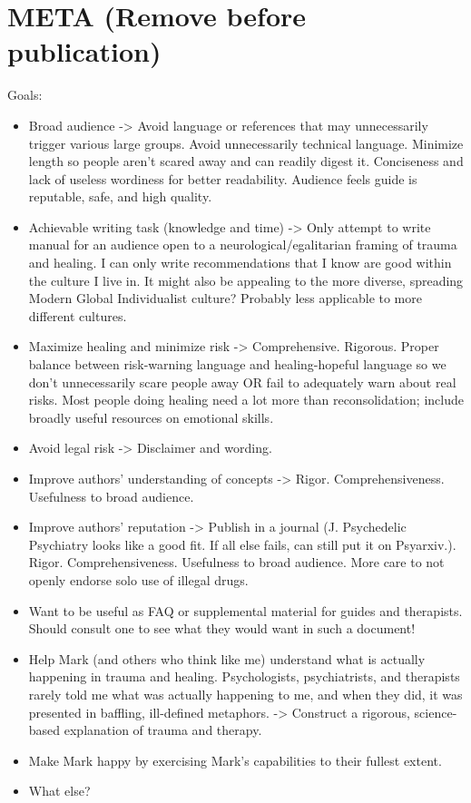 \documentclass[12pt,letterpaper]{article}
\begin{document}
\section*{META (Remove before publication)}
Goals:
\begin{itemize}
    \item Broad audience -> Avoid language or references that may unnecessarily trigger various large groups. Avoid unnecessarily technical language. Minimize length so people aren't scared away and can readily digest it. Conciseness and lack of useless wordiness for better readability. Audience feels guide is reputable, safe, and high quality.
    \item Achievable writing task (knowledge and time) -> Only attempt to write manual for an audience open to a neurological/egalitarian framing of trauma and healing. I can only write recommendations that I know are good within the culture I live in. It might also be appealing to the more diverse, spreading Modern Global Individualist culture? Probably less applicable to more different cultures.
    \item Maximize healing and minimize risk -> Comprehensive. Rigorous. Proper balance between risk-warning language and healing-hopeful language so we don't unnecessarily scare people away OR fail to adequately warn about real risks. Most people doing healing need a lot more than reconsolidation; include broadly useful resources on emotional skills.
    \item Avoid legal risk -> Disclaimer and wording.
    \item Improve authors' understanding of concepts -> Rigor. Comprehensiveness. Usefulness to broad audience.
    \item Improve authors' reputation -> Publish in a journal (J. Psychedelic Psychiatry looks like a good fit. If all else fails, can still put it on Psyarxiv.). Rigor. Comprehensiveness. Usefulness to broad audience. More care to not openly endorse solo use of illegal drugs.
    \item Want to be useful as FAQ or supplemental material for guides and therapists. Should consult one to see what they would want in such a document!
    \item Help Mark (and others who think like me) understand what is actually happening in trauma and healing. Psychologists, psychiatrists, and therapists rarely told me what was actually happening to me, and when they did, it was presented in baffling, ill-defined metaphors. -> Construct a rigorous, science-based explanation of trauma and therapy.
    \item Make Mark happy by exercising Mark's capabilities to their fullest extent.
    \item What else? 
\end{itemize}
\end{document}
